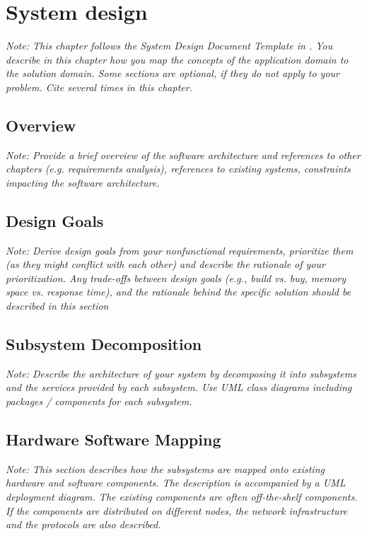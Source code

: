 \documentclass[a4paper,12pt,twoside]{report}
\begin{document}

\chapter{System design}

\textit{Note: This chapter follows the System Design Document Template in \cite{bruegge2004object}. 
You describe in this chapter how you map the concepts of the application domain to the solution domain. Some sections are optional, if they do not apply to your problem.
Cite \cite{bruegge2004object} several times in this chapter.}

\section{Overview}

\textit{Note: Provide a brief overview of the software architecture and references to other chapters (e.g. requirements analysis), references to existing systems, constraints impacting the software architecture.}

\section{Design Goals}

\textit{Note: Derive design goals from your nonfunctional requirements, prioritize them (as they might conflict with each other) and describe the rationale of your prioritization. Any trade-offs between design goals (e.g., build vs. buy, memory space vs. response time),
and the rationale behind the specific solution should be described in this section}

\section{Subsystem Decomposition}

\textit{Note: Describe the architecture of your system by decomposing it into subsystems and the services provided by each subsystem. Use UML class diagrams including packages / components for each subsystem.}

\section{Hardware Software Mapping}

\textit{Note: This section describes how the subsystems are mapped onto existing hardware and software components. The description is accompanied by a UML deployment diagram. The existing components are often off-the-shelf components. If the components are distributed on different nodes, the network infrastructure and the protocols are also described.}
\end{document}
